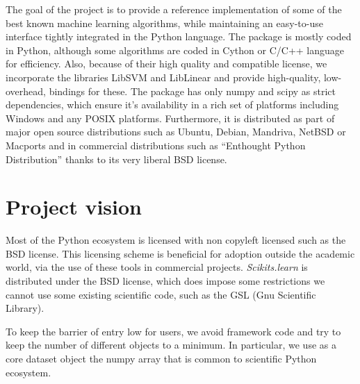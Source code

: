 \documentclass[twoside,11pt]{article}
\begin{document}
The goal of the project is to provide a reference implementation of some
of the best known machine learning algorithms, while maintaining an
easy-to-use interface tightly integrated in the Python language. The
package is mostly coded in Python, although some algorithms are coded in
Cython or C/C++ language for efficiency. Also, because of their high
quality and compatible license, we incorporate the libraries LibSVM
\citep{chang2001} and LibLinear \citep{fan2008} and provide high-quality,
low-overhead, bindings for these.
%
The package has only numpy and scipy as strict dependencies, which ensure
it's availability in a rich set of platforms including Windows and any
POSIX platforms. Furthermore, it is distributed as part of major open
source distributions such as Ubuntu, Debian, Mandriva, NetBSD or Macports
and in commercial distributions such as ``Enthought Python Distribution''
thanks to its very liberal BSD license.





\section {Project vision}


%
Most of the Python ecosystem is licensed with non copyleft licensed such
as the BSD license. This licensing scheme is beneficial for adoption
outside the academic world, via the use of these tools in commercial
projects. \emph{Scikits.learn} is distributed under the BSD license,
which does impose some restrictions we cannot use some existing
scientific code, such as the GSL (Gnu Scientific Library).

\smallskip
{}
%
To keep the barrier of entry low for users, we avoid framework code and
try to keep the number of different objects to a minimum. In particular,
we use as a core dataset object the numpy array \citep{Vanderwalt2011}
that is common to scientific Python ecosystem.
\end{document}
